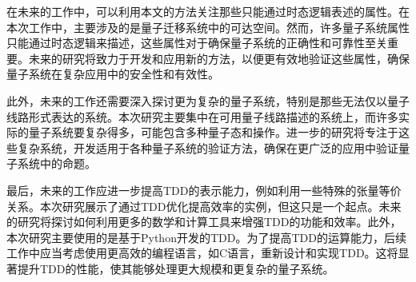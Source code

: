 在未来的工作中，可以利用本文的方法关注那些只能通过时态逻辑表述的属性。在本次工作中，主要涉及的是量子迁移系统中的可达空间。然而，许多量子系统属性只能通过时态逻辑来描述，这些属性对于确保量子系统的正确性和可靠性至关重要。未来的研究将致力于开发和应用新的方法，以便更有效地验证这些属性，确保量子系统在复杂应用中的安全性和有效性。

此外，未来的工作还需要深入探讨更为复杂的量子系统，特别是那些无法仅以量子线路形式表达的系统。本次研究主要集中在可用量子线路描述的系统上，而许多实际的量子系统要复杂得多，可能包含多种量子态和操作。进一步的研究将专注于这些复杂系统，开发适用于各种量子系统的验证方法，确保在更广泛的应用中验证量子系统中的命题。

最后，未来的工作应进一步提高TDD的表示能力，例如利用一些特殊的张量等价关系。本次研究展示了通过TDD优化提高效率的实例，但这只是一个起点。未来的研究将探讨如何利用更多的数学和计算工具来增强TDD的功能和效率。此外，本次研究主要使用的是基于Python开发的TDD。为了提高TDD的运算能力，后续工作中应当考虑使用更高效的编程语言，如C语言，重新设计和实现TDD。这将显著提升TDD的性能，使其能够处理更大规模和更复杂的量子系统。

